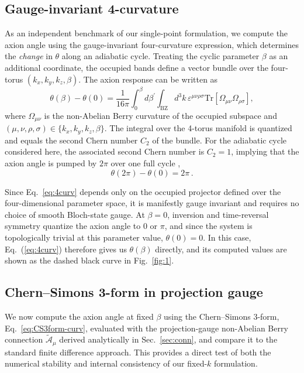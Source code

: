 \documentclass[galley,aps,pra,10pt,amsmath,amssymb,
    superscriptaddress,nofootinbib,longbibliography]{revtex4-2}
\newcounter{comm}
\newcommand{\eq}[1]{Eq.~(\ref{eq:#1})}
\begin{document}
\subsection{Gauge-invariant 4-curvature}
\label{sec:4curv}
As an independent benchmark of our single-point formulation, we compute the axion angle using the gauge-invariant four-curvature expression, which determines the \emph{change} in $\theta$ along an adiabatic cycle. Treating the cyclic parameter $\beta$ as an additional coordinate, the occupied bands define a vector bundle over the four-torus $(k_x,k_y,k_z,\beta)$. The axion response can be written as \cite{qi2008topological}
\begin{equation}
\label{eq:4curv}
    \theta(\beta) -\theta(0) = \frac{1}{16 \pi} \int_0^{\beta} d\beta^\prime \int_{\text{BZ}} d^3k\, \varepsilon^{\mu\nu\rho\sigma} \text{Tr} \left[\Omega_{\mu\nu} \Omega_{\rho\sigma} \right],
\end{equation}
where $\Omega_{\mu\nu}$ is the non-Abelian Berry curvature of the occupied subspace and $(\mu,\nu,\rho,\sigma) \in \{k_x,k_y,k_z,\beta\}$. The integral over the 4-torus manifold is quantized and equals the second Chern number $C_2$ of the bundle. For the adiabatic cycle considered here, the associated second Chern number is $C_2 = 1$, implying that the axion angle is pumped by $2\pi$ over one full cycle \cite{essin2009magnetoelectric,taherinejad2015adiabatic, essin2010orbital},
\begin{equation}
    \theta(2\pi) - \theta(0) = 2\pi\,.
\end{equation}

Since Eq.~\eqref{eq:4curv} depends only on the occupied projector defined over the four-dimensional parameter space, it is manifestly gauge invariant and requires no choice of smooth Bloch-state gauge. At $\beta=0$, inversion and time-reversal symmetry quantize the axion angle to $0$ or $\pi$, and since the system is topologically trivial at this parameter value, $\theta(0)=0$. In this case, \eq{4curv} therefore gives us $\theta(\beta)$ directly, and its computed values are shown as the dashed black curve in Fig.~\ref{fig:1}.

\subsection{Chern--Simons 3-form in projection gauge}

We now compute the axion angle at fixed $\beta$ using the Chern--Simons 3-form, Eq.~\ref{eq:CS3form-curv}, evaluated with the projection-gauge non-Abelian Berry connection $\tilde{\mathcal{A}}_\mu$ derived analytically in Sec.~\ref{sec:conn}, and compare it to the standard finite difference approach. This provides a direct test of both the numerical stability and internal consistency of our fixed-$k$ formulation.
\end{document}

